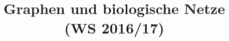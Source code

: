 \documentclass[12pt,a4paper]{article}
\title{\Huge\textbf{Graphen und biologische Netze (WS 2016/17)}}
\author{}
\date{}
\begin{document}
\begin{titlepage}

\maketitle
\thispagestyle{empty}
\end{titlepage}
\newpage

\begin{titlepage}
\tableofcontents
\thispagestyle{empty}
\end{titlepage}
\newpage



\newpage



\newpage



\newpage



\newpage



\newpage



\newpage



\newpage



\newpage



\newpage



\newpage


\end{document}
